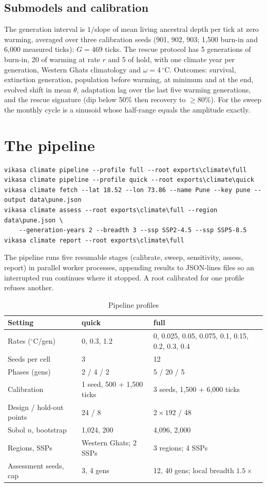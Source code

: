 \subsection{Submodels and calibration}
The generation interval is $1/$slope of mean living ancestral depth per tick at
zero warming, averaged over three calibration seeds (901, 902, 903; 1{,}500
burn-in and 6{,}000 measured ticks): $G=469$ ticks. The rescue protocol has 5
generations of burn-in, 20 of warming at rate $r$ and 5 of hold, with one climate
year per generation, Western Ghats climatology and $\omega=4\,^{\circ}$C.
Outcomes: survival, extinction generation, population before warming, at minimum
and at the end, evolved shift in mean $\theta$, adaptation lag over the last five
warming generations, and the rescue signature (dip below 50\% then recovery to
$\ge80\%$). For the sweep the monthly cycle is a sinusoid whose half-range equals
the amplitude exactly.

\section{The pipeline}
\begin{lstlisting}
vikasa climate pipeline --profile full --root exports\climate\full
vikasa climate pipeline --profile quick --root exports\climate\quick
vikasa climate fetch --lat 18.52 --lon 73.86 --name Pune --key pune --output data\pune.json
vikasa climate assess --root exports\climate\full --region data\pune.json \
    --generation-years 2 --breadth 3 --ssp SSP2-4.5 --ssp SSP5-8.5
vikasa climate report --root exports\climate\full
\end{lstlisting}
The pipeline runs five resumable stages (calibrate, sweep, sensitivity, assess,
report) in parallel worker processes, appending results to JSON-lines files so an
interrupted run continues where it stopped. A root calibrated for one profile
refuses another.

\begin{table}[htbp]
\centering
\caption{Pipeline profiles}
\begin{tabularx}{\textwidth}{lLL}
\toprule
Setting & quick & full \\
\midrule
Rates ($^{\circ}$C/gen) & 0, 0.3, 1.2 & 0, 0.025, 0.05, 0.075, 0.1, 0.15, 0.2, 0.3, 0.4 \\
Seeds per cell & 3 & 12 \\
Phases (gens) & 2 / 4 / 2 & 5 / 20 / 5 \\
Calibration & 1 seed, 500 + 1{,}500 ticks & 3 seeds, 1{,}500 + 6{,}000 ticks \\
Design / hold-out points & 24 / 8 & $2\times192$ / 48 \\
Sobol $n$, bootstrap & 1{,}024, 200 & 4{,}096, 2{,}000 \\
Regions, SSPs & Western Ghats; 2 SSPs & 3 regions; 4 SSPs \\
Assessment seeds, cap & 3, 4 gens & 12, 40 gens; local breadth $1.5\times$ \\
\bottomrule
\end{tabularx}
\end{table}

